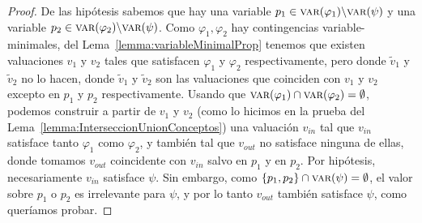 \begin{proof}
De las hipótesis sabemos que hay una variable $p_1 \in \textsc{var}(\varphi_1) \backslash \textsc{var}(\psi)$ y una variable $p_2 \in \textsc{var}(\varphi_2) \backslash \textsc{var}(\psi)$.  Como $\varphi_1, \varphi_2$ hay contingencias variable-minimales, del Lema~\ref{lemma:variableMinimalProp} tenemos que existen valuaciones $v_1$ y $v_2$ tales que satisfacen $\varphi_1$ y $\varphi_2$ respectivamente, pero donde $\tilde{v}_1$ y $\tilde{v}_2$ no lo hacen, donde $\tilde{v}_1$ y $\tilde{v}_2$ son las valuaciones que coinciden con $v_1$ y $v_2$ excepto en $p_1$ y $p_2$ respectivamente. Usando que $\textsc{var}(\varphi_1) \cap \textsc{var}(\varphi_2) = \emptyset$, podemos construir a partir de $v_1$ y $v_2$ (como lo hicimos en la prueba del Lema~\ref{lemma:InterseccionUnionConceptos}) una valuación $v_{in}$ tal que $v_{in}$ satisface  tanto $\varphi_1$ como $\varphi_2$, y también tal que $v_{out}$ no satisface ninguna de ellas, donde tomamos $v_{out}$ coincidente con $v_{in}$ salvo en $p_1$ y en $p_2$. Por hipótesis, necesariamente $v_{in}$ satisface $\psi$. Sin embargo, como $\{p_1, p_2\} \cap \textsc{var}(\psi) = \emptyset$, el valor sobre $p_1$ o $p_2$ es irrelevante para  $\psi$, y por lo tanto $v_{out}$ también satisface $\psi$, como queríamos probar.
\end{proof}

